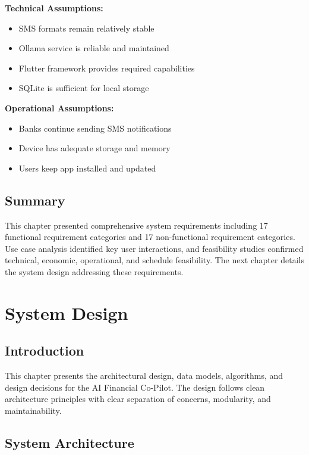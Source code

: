 \documentclass[11pt,a4paper]{report}
\begin{document}
\textbf{Technical Assumptions:}
\begin{itemize}
    \item SMS formats remain relatively stable
    \item Ollama service is reliable and maintained
    \item Flutter framework provides required capabilities
    \item SQLite is sufficient for local storage
\end{itemize}

\textbf{Operational Assumptions:}
\begin{itemize}
    \item Banks continue sending SMS notifications
    \item Device has adequate storage and memory
    \item Users keep app installed and updated
\end{itemize}

\section{Summary}

This chapter presented comprehensive system requirements including 17 functional requirement categories and 17 non-functional requirement categories. Use case analysis identified key user interactions, and feasibility studies confirmed technical, economic, operational, and schedule feasibility. The next chapter details the system design addressing these requirements.

\chapter{System Design}

\section{Introduction}

This chapter presents the architectural design, data models, algorithms, and design decisions for the AI Financial Co-Pilot. The design follows clean architecture principles with clear separation of concerns, modularity, and maintainability.

\section{System Architecture}
\end{document}
